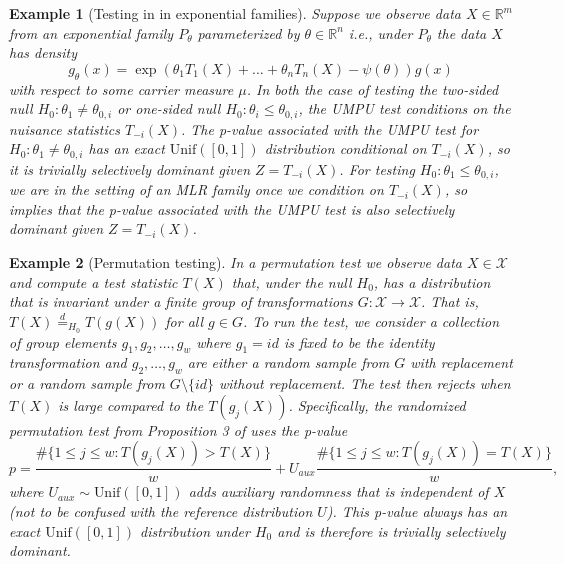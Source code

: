 \documentclass{article}
\newtheorem{example}{Example}
\newcommand{\R}{\mathbb{R}}
\begin{document}
\begin{example}[Testing in in exponential families]
\label{exm:exp_fam}
Suppose we observe data $X \in \R^m$ from an exponential family $P_{\theta}$ parameterized by $\theta \in \R^n$ i.e., under $P_{\theta}$ the data $X$ has density  
\begin{equation*}
    g_{\theta}(x) = \exp( \theta_1 T_1(X) + \dots + \theta_n T_n(X) - \psi(\theta) ) g(x) 
\end{equation*}
with respect to some carrier measure $\mu$. In both the case of testing the two-sided null $H_0: \theta_1 \neq \theta_{0, i}$ or one-sided null $H_0: \theta_i \leq \theta_{0, i}$, the UMPU test conditions on the nuisance statistics $T_{-i}(X)$. The p-value associated with the UMPU test for $H_0: \theta_1 \neq \theta_{0, i}$ has an exact $\text{Unif}([0, 1])$ distribution conditional on $T_{-i}(X)$, so it is trivially selectively dominant given $Z = T_{-i}(X)$. For testing $H_0: \theta_1 \leq \theta_{0, i}$, we are in the setting of an MLR family once we condition on $T_{-i}(X)$, so  implies that the p-value associated with the UMPU test is also selectively dominant given $Z = T_{-i}(X)$.
\end{example}

\begin{example}[Permutation testing]
In a permutation test we observe data $X \in \mathcal{X}$ and compute a test statistic $T(X)$ that, under the null $H_0$, has a distribution that is invariant under a finite group of transformations $G : \mathcal{X} \rightarrow \mathcal{X}$. That is, $T(X) \overset{d}{=}_{H_0} T(g(X))$ for all $ g \in G$. To run the test, we consider a collection of group elements $g_1, g_2, \dots, g_w$ where $g_1 = id$ is fixed to be the identity transformation and $g_2, \dots, g_w$ are either a random sample from $G$ with replacement or a random sample from $G \setminus \{id \}$ without replacement. The test then rejects when $T(X)$ is large compared to the $T(g_j(X))$. Specifically, the randomized permutation test from Proposition 3 of \cite{Hemerik} uses the p-value
\begin{equation*}
    p = \frac{\#\{1 \leq j \leq w : T(g_j(X)) > T(X) \}}{w} + U_{aux} \frac{\#\{1 \leq j \leq w : T(g_j(X)) = T(X) \}}{w},
\end{equation*}
where $U_{aux} \sim \text{Unif}([0, 1])$ adds auxiliary randomness that is independent of $X$ (not to be confused with the reference distribution $U$). This p-value always has an exact $\text{Unif}([0, 1])$ distribution under $H_0$ and is therefore is trivially selectively dominant. 
\end{example}
\end{document}

